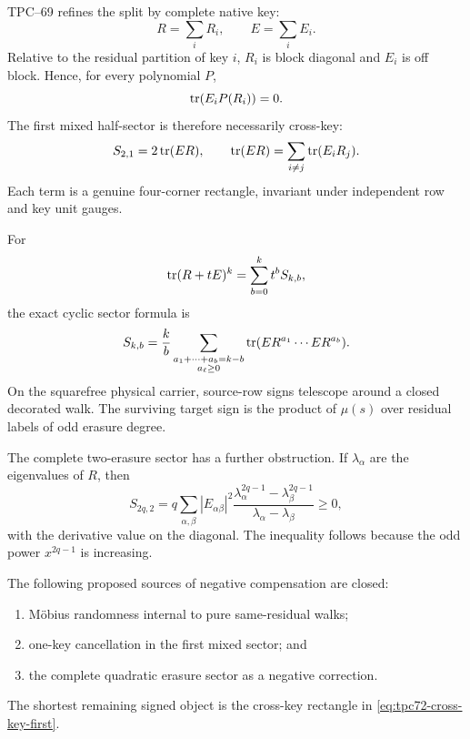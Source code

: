 TPC--69 refines the split by complete native key:
\begin{equation}
 R=\sum_iR_i,
 \qquad
 E=\sum_iE_i.
 \label{eq:tpc72-key-decomposition}
\end{equation}
Relative to the residual partition of key \(i\), \(R_i\) is block diagonal
and \(E_i\) is off block.  Hence, for every polynomial \(P\),
\begin{equation}
 \operatorname{tr}(E_iP(R_i))=0.
 \label{eq:tpc72-one-key-vanishing}
\end{equation}
The first mixed half-sector is therefore necessarily cross-key:
\begin{equation}
 S_{2,1}=2\operatorname{tr}(ER),
 \qquad
 \operatorname{tr}(ER)=\sum_{i\ne j}\operatorname{tr}(E_iR_j).
 \label{eq:tpc72-cross-key-first}
\end{equation}
Each term is a genuine four-corner rectangle, invariant under independent
row and key unit gauges.

For
\[
 \operatorname{tr}(R+tE)^k=\sum_{b=0}^kt^bS_{k,b},
\]
the exact cyclic sector formula is
\begin{equation}
 S_{k,b}
 =
 \frac{k}{b}
 \sum_{\substack{a_1+\cdots+a_b=k-b\\a_\ell\ge0}}
 \operatorname{tr}(ER^{a_1}\cdots ER^{a_b}).
 \label{eq:tpc72-cyclic-sector}
\end{equation}
On the squarefree physical carrier, source-row signs telescope around a
closed decorated walk.  The surviving target sign is the product of
\(\mu(s)\) over residual labels of odd erasure degree.

The complete two-erasure sector has a further obstruction.  If
\(\lambda_\alpha\) are the eigenvalues of \(R\), then
\begin{equation}
 S_{2q,2}
 =
 q\sum_{\alpha,\beta}
 |E_{\alpha\beta}|^2
 \frac{\lambda_\alpha^{2q-1}-\lambda_\beta^{2q-1}}
      {\lambda_\alpha-\lambda_\beta}
 \ge0,
 \label{eq:tpc72-quadratic-positive}
\end{equation}
with the derivative value on the diagonal.  The inequality follows because
the odd power \(x^{2q-1}\) is increasing.

\begin{corollary}
\label{cor:signed-door-reduction}
The following proposed sources of negative compensation are closed:
\begin{enumerate}[label=\textup{(\roman*)},leftmargin=3em]
 \item M\"obius randomness internal to pure same-residual walks;
 \item one-key cancellation in the first mixed sector; and
 \item the complete quadratic erasure sector as a negative correction.
\end{enumerate}
The shortest remaining signed object is the cross-key rectangle in
\eqref{eq:tpc72-cross-key-first}.
\end{corollary}

